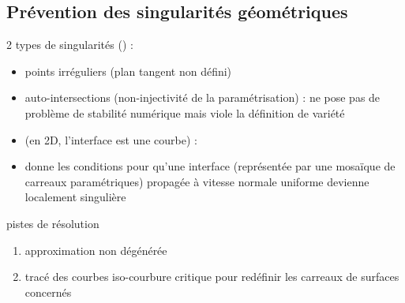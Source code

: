 \subsection{Prévention des singularités géométriques}

2 types de singularités (\cite[p.320]{patrikalakis2009}) :
\begin{itemize}
	\item points irréguliers (plan tangent non défini)
	\item auto-intersections (non-injectivité de la paramétrisation) : ne pose pas de problème de stabilité numérique mais viole la définition de variété
\end{itemize}

\begin{itemize}
	\item \cite{jiao2001} (en 2D, \ie l'interface est une courbe) : 
	\item \cite{farouki1986} donne les conditions pour qu'une interface (représentée par une mosaïque de carreaux paramétriques) propagée à vitesse normale uniforme devienne localement singulière
\end{itemize}

pistes de résolution
\begin{enumerate}
	\item approximation non dégénérée \cite{farouki1986}
	\item tracé des courbes iso-courbure critique \cite[chap.8]{patrikalakis2009} pour redéfinir les carreaux de surfaces concernés
\end{enumerate}


